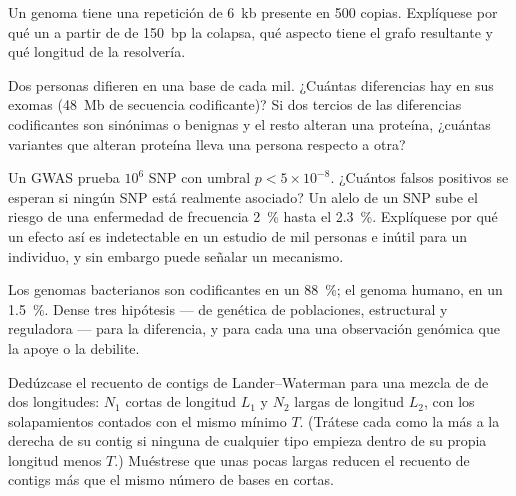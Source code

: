 \begin{exercise}[$\star\star$]\label{exo:b3:genomics:7}
Un genoma tiene una repetición de \qty{6}{kb} presente en \num{500}
copias. Explíquese por qué un  a partir de  de
\qty{150}{bp} la colapsa, qué aspecto tiene el grafo resultante y qué
longitud de  la resolvería.
\end{exercise}

\begin{exercise}[$\star\star$]\label{exo:b3:genomics:8}
Dos personas difieren en una base de cada mil. ¿Cuántas diferencias hay
en sus exomas (\qty{48}{Mb} de secuencia codificante)? Si dos tercios de
las diferencias codificantes son sinónimas o benignas y el resto alteran
una proteína, ¿cuántas variantes que alteran proteína lleva una persona
respecto a otra?
\end{exercise}

\begin{exercise}[$\star\star$]\label{exo:b3:genomics:9}
Un GWAS prueba $10^{6}$ SNP con umbral $p < 5\times 10^{-8}$. ¿Cuántos
falsos positivos se esperan si ningún SNP está realmente asociado? Un
alelo de un SNP sube el riesgo de una enfermedad de frecuencia
\qty{2}{\%} hasta el \qty{2.3}{\%}. Explíquese por qué un efecto así es
indetectable en un estudio de mil personas e inútil para un individuo, y
sin embargo puede señalar un mecanismo.
\end{exercise}

\begin{exercise}[$\star\star\star$]\label{exo:b3:genomics:10}
Los genomas bacterianos son codificantes en un \qty{88}{\%}; el genoma
humano, en un \qty{1.5}{\%}. Dense tres hipótesis --- de genética de
poblaciones, estructural y reguladora --- para la diferencia, y para cada
una una observación genómica que la apoye o la debilite.
\end{exercise}

\begin{exercise}[$\star\star\star$]\label{exo:b3:genomics:11}
Dedúzcase el recuento de contigs de Lander--Waterman para una mezcla de
 de dos longitudes: $N_{1}$  cortas de longitud $L_{1}$ y
$N_{2}$  largas de longitud $L_{2}$, con los solapamientos
contados con el mismo mínimo $T$. (Trátese cada  como la más a la
derecha de su contig si ninguna  de cualquier tipo empieza dentro
de su propia longitud menos $T$.) Muéstrese que unas pocas 
largas reducen el recuento de contigs más que el mismo número de bases en
 cortas.
\end{exercise}

